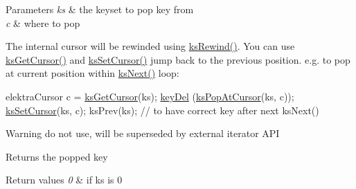 \begin{DoxyParams}{Parameters}
{\em ks} & the keyset to pop key from \\
\hline
{\em c} & where to pop\\
\hline
\end{DoxyParams}
The internal cursor will be rewinded using \hyperlink{group__keyset_gabe793ff51f1728e3429c84a8a9086b70}{ks\+Rewind()}. You can use \hyperlink{group__keyset_gace0444eb8ec958a429794f8586fc72e7}{ks\+Get\+Cursor()} and \hyperlink{group__keyset_ga28b2a7d13c620b3c9d4815a0608c738f}{ks\+Set\+Cursor()} jump back to the previous position. e.\+g. to pop at current position within \hyperlink{group__keyset_ga317321c9065b5a4b3e33fe1c399bcec9}{ks\+Next()} loop\+: 
\begin{DoxyCode}
elektraCursor c = \hyperlink{group__keyset_gace0444eb8ec958a429794f8586fc72e7}{ksGetCursor}(ks);
\hyperlink{group__key_ga3df95bbc2494e3e6703ece5639be5bb1}{keyDel} (\hyperlink{group__api_ga144904407e2014d5d597c10f4041738e}{ksPopAtCursor}(ks, c));
\hyperlink{group__keyset_ga28b2a7d13c620b3c9d4815a0608c738f}{ksSetCursor}(ks, c);
ksPrev(ks); \textcolor{comment}{// to have correct key after next ksNext()}
\end{DoxyCode}


\begin{DoxyWarning}{Warning}
do not use, will be superseded by external iterator A\+PI
\end{DoxyWarning}
\begin{DoxyReturn}{Returns}
the popped key 
\end{DoxyReturn}

\begin{DoxyRetVals}{Return values}
{\em 0} & if ks is 0 \\
\hline
\end{DoxyRetVals}
